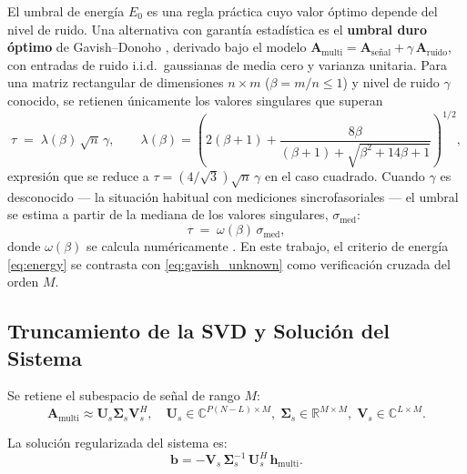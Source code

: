 El umbral de energía $E_0$ es una regla práctica cuyo valor óptimo depende
del nivel de ruido. Una alternativa con garantía estadística es el
\textbf{umbral duro óptimo} de Gavish--Donoho \cite{gavish2014,brunton2022},
derivado bajo el modelo
$\mathbf{A}_{\mathrm{multi}} = \mathbf{A}_{\mathrm{señal}} +
\gamma\,\mathbf{A}_{\mathrm{ruido}}$, con entradas de ruido i.i.d.\
gaussianas de media cero y varianza unitaria. Para una matriz rectangular
de dimensiones $n\times m$ ($\beta = m/n \le 1$) y nivel de ruido $\gamma$
conocido, se retienen únicamente los valores singulares que superan
\begin{equation}
    \tau \;=\; \lambda(\beta)\,\sqrt{n}\,\gamma,
    \qquad
    \lambda(\beta) = \left( 2(\beta+1) +
    \frac{8\beta}{(\beta+1) + \sqrt{\beta^2 + 14\beta + 1}} \right)^{1/2},
    \label{eq:gavish_known}
\end{equation}
expresión que se reduce a $\tau = (4/\sqrt{3})\sqrt{n}\,\gamma$ en el caso
cuadrado. Cuando $\gamma$ es desconocido --- la situación habitual con
mediciones sincrofasoriales --- el umbral se estima a partir de la mediana
de los valores singulares, $\sigma_{\mathrm{med}}$:
\begin{equation}
    \tau \;=\; \omega(\beta)\,\sigma_{\mathrm{med}},
    \label{eq:gavish_unknown}
\end{equation}
donde $\omega(\beta)$ se calcula numéricamente \cite{gavish2014}. En este
trabajo, el criterio de energía \eqref{eq:energy} se contrasta con
\eqref{eq:gavish_unknown} como verificación cruzada del orden $M$.

\subsection{Truncamiento de la SVD y Solución del Sistema}

Se retiene el subespacio de señal de rango $M$:
\begin{equation}
\mathbf{A}_{\text{multi}} \approx \mathbf{U}_s \boldsymbol{\Sigma}_s \mathbf{V}_s^H,
\quad
\mathbf{U}_s \in \mathbb{C}^{P(N-L)\times M},\;
\boldsymbol{\Sigma}_s \in \mathbb{R}^{M\times M},\;
\mathbf{V}_s \in \mathbb{C}^{L\times M}.
\label{eq:truncsvd}
\end{equation}

La solución regularizada del sistema es:
\begin{equation}
\boxed{\mathbf{b} = -\mathbf{V}_s\,\boldsymbol{\Sigma}_s^{-1}\,\mathbf{U}_s^H\,\mathbf{h}_{\text{multi}}}.
\label{eq:solution_final}
\end{equation}

